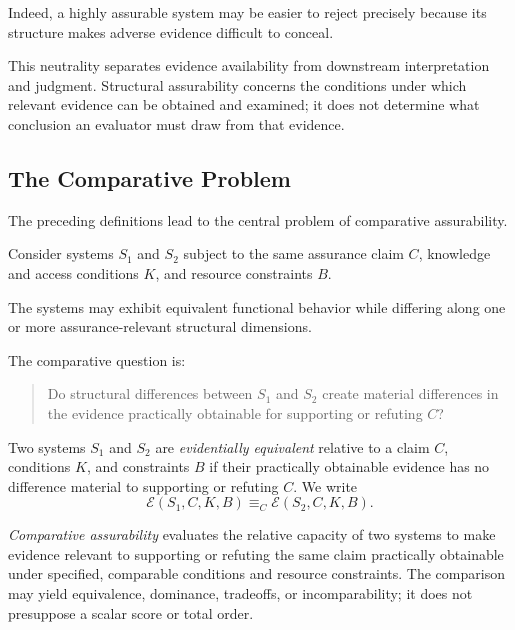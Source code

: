 Indeed, a highly assurable system may be easier to reject precisely
because its structure makes adverse evidence difficult to conceal.

This neutrality separates evidence availability from downstream
interpretation and judgment.
Structural assurability concerns the conditions under which relevant
evidence can be obtained and examined; it does not determine what
conclusion an evaluator must draw from that evidence.

\subsection{The Comparative Problem}
\label{aa.subsec.comparative-problem}

The preceding definitions lead to the central problem of comparative
assurability.

Consider systems \(S_1\) and \(S_2\) subject to the same assurance
claim \(C\), knowledge and access conditions \(K\), and resource
constraints \(B\).

The systems may exhibit equivalent functional behavior while differing
along one or more assurance-relevant structural dimensions.

The comparative question is:

\begin{quote}
  Do structural differences between \(S_1\) and \(S_2\) create
  material differences in the evidence practically obtainable
  for supporting or refuting \(C\)?
\end{quote}

\begin{definition}
  \label{se320.def.EvidentiaryEquivalence}
  Two systems \(S_1\) and \(S_2\) are \emph{evidentially equivalent}
  relative to a claim \(C\), conditions \(K\), and constraints \(B\)
  if their practically obtainable evidence has no difference
  material to supporting or refuting \(C\). We write
  \[
    \mathcal{E}(S_1,C,K,B)
    \equiv_C
    \mathcal{E}(S_2,C,K,B).
  \]
\end{definition}

\begin{definition}
  \label{se320.def.ComparativeAssurability}
  \emph{Comparative assurability} evaluates the relative capacity
  of two systems to make evidence relevant to supporting or
  refuting the same claim practically obtainable under specified,
  comparable conditions and resource constraints.
  The comparison may yield equivalence, dominance, tradeoffs,
  or incomparability; it does not presuppose a scalar score
  or total order.
\end{definition}

